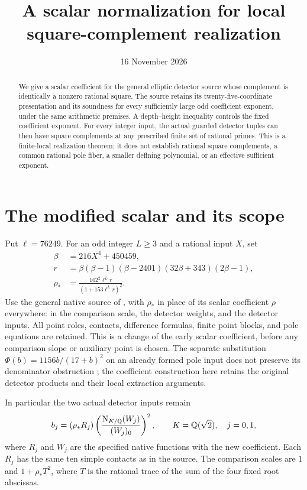 \documentclass[11pt,a4paper]{article}
\title{A scalar normalization for local square-complement realization}
\author{}\date{16 November 2026}
\newcommand{\Q}{\mathbb Q}\newcommand{\Z}{\mathbb Z}
\begin{document}
\maketitle
\begin{abstract}
We give a scalar coefficient for the general elliptic detector source
whose complement is identically a nonzero rational square. The source
retains its twenty-five-coordinate presentation and its soundness for
every sufficiently large odd coefficient exponent, under the same
arithmetic premises. A depth--height inequality controls the fixed
coefficient exponent. For every integer input, the actual guarded
detector tuples can then have square complements at any prescribed finite
set of rational primes. This is a finite-local realization theorem; it
does not establish rational square complements, a common rational pole
fiber, a smaller defining polynomial, or an effective sufficient exponent.
\end{abstract}

\section{The modified scalar and its scope}

Put $\ell=76249$. For an odd integer $L\ge3$ and a rational input $X$, set
\begin{align}
 \beta&=216X^4+450459,\label{eq:beta}\\
 r&=\beta(\beta-1)(\beta-2401)(32\beta+343)(2\beta-1),\label{eq:r}\\
 \rho_*&=\frac{102^2\ell^L r}{(1+153\ell^L r)^2}.\label{eq:rho}
\end{align}
Use the general native source of \cite[Sections 3--6]{UnitNorm}, with
$\rho_*$ in place of its scalar coefficient $\rho$ everywhere: in the
comparison scale, the detector weights, and the detector inputs.
All point roles, contacts, difference formulas, finite point blocks,
and pole equations are retained. This is a change of the early scalar
coefficient, before any comparison slope or auxiliary point is chosen.
The separate substitution $\Phi(b)=1156b/(17+b)^2$ on an already
formed pole input does not preserve its denominator obstruction
\cite{Normalization}; the coefficient construction here retains the
original detector products and their local extraction arguments.

In particular the two actual detector inputs remain
\begin{equation}\label{eq:detector}
 b_j=(\rho_*R_j)
       \left(\frac{\N_{K/\Q}(W_j)}{(W_j)_0}\right)^2,
 \qquad K=\Q(\sqrt2),\quad j=0,1,
\end{equation}
where $R_j$ and $W_j$ are the specified native functions with the new
coefficient. Each $R_j$ has the same ten simple contacts as in the source.
The comparison scales are $1$ and $1+\rho_*T^2$, where $T$ is the
rational trace of the sum of the four fixed root abscissas.
\end{document}
